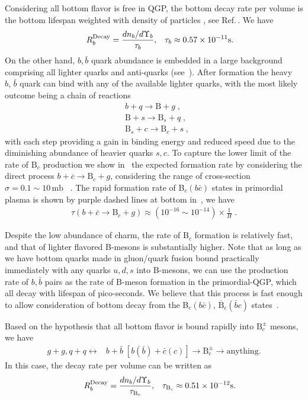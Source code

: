 Considering all bottom flavor is free in QGP, the bottom decay rate per volume is the bottom lifespan weighted with density of particles , see Ref.\,\cite{Kuznetsova:2008jt}. We have
\begin{align}\hspace{0.5cm}
R^{\mathrm{Decay}}_b=\frac{dn_b/d\Upsilon_b}{\tau_b},\,\,\,\,\, \tau_b\approx0.57\times10^{-11} \mathrm{s}.
\end{align}
On the other hand, $b$,\,$\bar b$ quark abundance is embedded in a large background comprising all lighter quarks and anti-quarks (see~). After formation the heavy $b,\,\bar b$ quark can bind with any of the available lighter quarks, with the most likely outcome being a chain of reactions 
\begin{align}
&b+q\longrightarrow\mathrm{B}+g\;,\\
&\mathrm{B}+s\longrightarrow\mathrm{B}_s+q\;,\\
&\mathrm{B}_s+c\longrightarrow\mathrm{B}_c+s\;,
\end{align}
with each step providing a gain in binding energy and reduced speed due to the diminishing abundance of heavier quarks $s, c$. To capture the lower limit of the rate of $\mathrm{B}_c$ production we show in~ the expected formation rate by considering the direct process $b+\overline c\rightarrow \mathrm{B}_c+g$, considering the range of cross-section $\sigma=0.1\sim10\,\mathrm{mb}$ ~\cite{Schroedter:2000ek}. The rapid formation rate of B$_c(b\bar c)$ states in primordial plasma is shown by purple dashed lines at bottom in~, we have
\begin{align}
\tau (b+\overline c\rightarrow \mathrm{B}_c+g)\approx(10^{-16}\sim10^{-14})\times\frac{1}{H} \;.
\end{align}

Despite the low abundance of charm, the rate of $\mathrm{B}_c$ formation is relatively fast, and that of lighter flavored B-mesons is substantially higher. Note that as long as we have bottom quarks made in gluon/quark fusion bound practically immediately with any quarks $u, d, s$ into B-mesons, we can use the production rate of $b, \bar b$ pairs as the rate of B-meson formation in the primordial-QGP, which all decay with lifespan of pico-seconds. We believe that this process is fast enough to allow consideration of bottom decay from the B$_c(b\bar c)$, $\overline{\mathrm{B}}_c(\bar b c)$ states~\cite{Yang:2020nne}. 
 
Based on the hypothesis that all bottom flavor is bound rapidly into $\mathrm{B}_c^\pm$ mesons, we have 
\begin{align}\label{Bc_source}
g+g, q+q \longleftrightarrow &b+\bar b\;[b(\bar{b})+\bar{c}(c)]\longrightarrow \mathrm{B}_c^\pm\longrightarrow\mathrm{anything}.
\end{align}
In this case, the decay rate per volume can be written as
\begin{align}\hspace{0.5cm}
 R^{\mathrm{Decay}}_b=\frac{dn_b/d\Upsilon_b}{\tau_{\mathrm{B}_c}},\,\,\,\,\, \tau_{\mathrm{B}_c}\approx0.51\times10^{-12} \mathrm{s}.
 \end{align}

